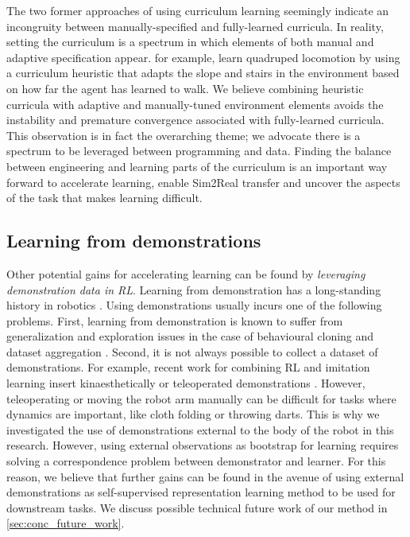 \documentclass[\home/main.tex]{subfiles}
\begin{document}
The two former approaches of using curriculum learning seemingly indicate an incongruity between manually-specified and fully-learned curricula. In reality, setting the curriculum is a spectrum in which elements of both manual and adaptive specification appear. \textcite{rudin2021learning} for example, learn quadruped locomotion by using a curriculum heuristic that adapts the slope and stairs in the environment based on how far the agent has learned to walk. 
We believe combining heuristic curricula with adaptive and manually-tuned environment elements avoids the instability and premature convergence associated with fully-learned curricula. 
This observation is in fact the overarching theme; we advocate there is a spectrum to be leveraged between programming and data. Finding the balance between engineering and learning parts of the curriculum is an important way forward to accelerate learning, enable Sim2Real transfer and uncover the aspects of the task that makes learning difficult. 

\subsection{Learning from demonstrations}
Other potential gains for accelerating learning can be found by \emph{leveraging demonstration data in RL}. 
Learning from demonstration has a long-standing history in robotics \autocite{Argall2009}. Using demonstrations usually incurs one of the following problems. 
First, learning from demonstration is known to suffer from generalization and exploration issues in the case of behavioural cloning and dataset aggregation \autocite{Ibarz2021}.
Second, it is not always possible to collect a dataset of demonstrations. For example, recent work for combining RL and imitation learning insert kinaesthetically \autocite{vecerik2018leveraging} or teleoperated demonstrations \autocite{Zhu-RSS-18}. However, teleoperating or moving the robot arm manually can be difficult for tasks where dynamics are important, like cloth folding or throwing darts. This is why we investigated the use of demonstrations external to the body of the robot in this research. However, using external observations as bootstrap for learning requires solving a correspondence problem between demonstrator and learner. For this reason, we believe that further gains can be found in the avenue of using external demonstrations as self-supervised representation learning method to be used for downstream tasks. We discuss possible technical future work of our method in \cref{sec:conc_future_work}. 
\end{document}
